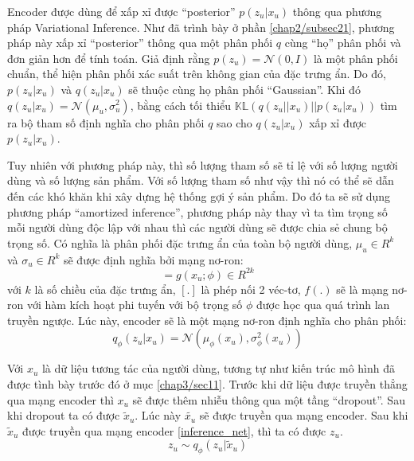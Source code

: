     Encoder được dùng để xấp xỉ được ``posterior'' $p(z_u|x_u)$ thông qua phương pháp Variational Inference. 
    Như đã trình bày ở phần \ref{chap2/subsec21}, phương pháp này xấp xỉ ``posterior'' thông qua một phân phối $q$ cùng ``họ'' phân phối và đơn giản hơn để tính toán.
    Giả định rằng $p(z_u) = \mathcal{N}(0,I)$ là một phân phối chuẩn, thể hiện phân phối xác suất trên không gian của đặc trưng ẩn.
    Do đó, $p(z_u|x_u)$ và $q(z_u|x_u)$ sẽ thuộc cùng họ phân phối ``Gaussian''. 
    Khi đó $q(z_u|x_u) = \mathcal{N}(\mu_u,\sigma_u^2)$, bằng cách tối thiểu $\mathbb{KL}(q(z_u||x_u) || p(z_u|x_u))$ tìm ra bộ tham số định nghĩa cho phân phối $q$ sao cho $q(z_u | x_u)$ xấp xỉ được $p(z_u|x_u)$.    

    Tuy nhiên với phương pháp này, thì số lượng tham số sẽ tỉ lệ với số lượng người dùng và số lượng sản phẩm.
    Với số lượng tham số như vậy thì nó có thể sẽ dẫn đến các khó khăn khi xây dựng hệ thống gợi ý sản phẩm.
    Do đó ta sẽ sử dụng phương pháp ``amortized inference'', phương pháp này thay vì ta tìm trọng số mỗi người dùng độc lập với nhau thì các người dùng sẽ được chia sẻ chung bộ trọng số.
    Có nghĩa là phân phối đặc trưng ẩn của toàn bộ người dùng, $\mu_u \in R^k $ và $\sigma_u \in R^k $ sẽ được định nghĩa bởi mạng nơ-ron:
    \begin{equation}
        [\mu_u,\sigma_u] = g(x_u;\phi) \in R^{2k}
    \end{equation}
    với $k$ là số chiều của đặc trưng ẩn, $[.]$ là phép nối 2 véc-tơ, $f(.)$ sẽ là mạng nơ-ron với hàm kích hoạt phi tuyến với bộ trọng số $\phi$ được học qua quá trình lan truyền ngược.
    Lúc này, encoder sẽ là một mạng nơ-ron định nghĩa cho phân phối:
    \begin{equation}
        \label{inference_net}
        q_\phi(z_u|x_u) = \mathcal{N}(\mu_\phi(x_u),\sigma^2_\phi(x_u))
    \end{equation}
    


    Với $x_u$ là dữ liệu tương tác của người dùng, tương tự như kiến trúc mô hình đã được tình bày trước đó ở mục \ref{chap3/sec11}.
    Trước khi dữ liệu được truyền thẳng qua mạng encoder thì $x_u$ sẽ được thêm nhiễu thông qua một tầng ``dropout''. 
    Sau khi dropout ta có được $\tilde{x}_u$. 
    Lúc này $\tilde{x_u}$ sẽ được truyền qua mạng encoder. 
    Sau khi $\tilde{x}_u$ được truyền qua mạng encoder \ref{inference_net}, thì ta có được $z_u$.
    \begin{equation}
        \label{sampling_zu}
        z_u \sim q_\phi(z_u|\tilde{x}_u)
    \end{equation}

